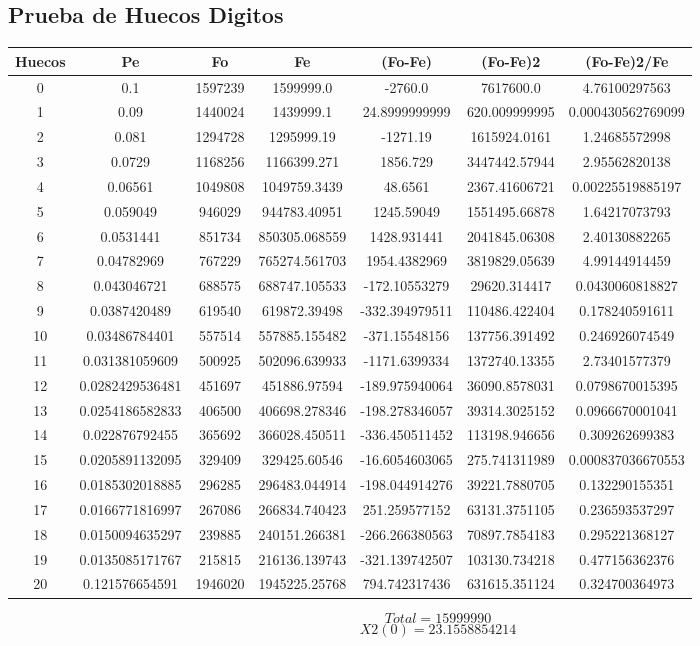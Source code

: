 \documentclass{article}
\begin{document}
\subsection{Prueba de Huecos Digitos}
\begin{tabular}{|c|c|c|c|c|c|c|}
Huecos&Pe&Fo&Fe&(Fo{-}Fe)&(Fo{-}Fe)2&(Fo{-}Fe)2/Fe\\
\hline
0&0.1&1597239&1599999.0&{-}2760.0&7617600.0&4.76100297563\\
\hline
1&0.09&1440024&1439999.1&24.8999999999&620.009999995&0.000430562769099\\
\hline
2&0.081&1294728&1295999.19&{-}1271.19&1615924.0161&1.24685572998\\
\hline
3&0.0729&1168256&1166399.271&1856.729&3447442.57944&2.95562820138\\
\hline
4&0.06561&1049808&1049759.3439&48.6561&2367.41606721&0.00225519885197\\
\hline
5&0.059049&946029&944783.40951&1245.59049&1551495.66878&1.64217073793\\
\hline
6&0.0531441&851734&850305.068559&1428.931441&2041845.06308&2.40130882265\\
\hline
7&0.04782969&767229&765274.561703&1954.4382969&3819829.05639&4.99144914459\\
\hline
8&0.043046721&688575&688747.105533&{-}172.10553279&29620.314417&0.0430060818827\\
\hline
9&0.0387420489&619540&619872.39498&{-}332.394979511&110486.422404&0.178240591611\\
\hline
10&0.03486784401&557514&557885.155482&{-}371.15548156&137756.391492&0.246926074549\\
\hline
11&0.031381059609&500925&502096.639933&{-}1171.6399334&1372740.13355&2.73401577379\\
\hline
12&0.0282429536481&451697&451886.97594&{-}189.975940064&36090.8578031&0.0798670015395\\
\hline
13&0.0254186582833&406500&406698.278346&{-}198.278346057&39314.3025152&0.0966670001041\\
\hline
14&0.022876792455&365692&366028.450511&{-}336.450511452&113198.946656&0.309262699383\\
\hline
15&0.0205891132095&329409&329425.60546&{-}16.6054603065&275.741311989&0.000837036670553\\
\hline
16&0.0185302018885&296285&296483.044914&{-}198.044914276&39221.7880705&0.132290155351\\
\hline
17&0.0166771816997&267086&266834.740423&251.259577152&63131.3751105&0.236593537297\\
\hline
18&0.0150094635297&239885&240151.266381&{-}266.266380563&70897.7854183&0.295221368127\\
\hline
19&0.0135085171767&215815&216136.139743&{-}321.139742507&103130.734218&0.477156362376\\
\hline
20&0.121576654591&1946020&1945225.25768&794.742317436&631615.351124&0.324700364973\\
\end{tabular}
$$
Total = 15999990
$$
$$
X2(0) = 23.1558854214
$$
\end{document}
